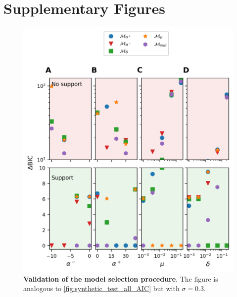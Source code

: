 \newcommand{\M}{\mathcal{M}}
\newcommand{\modnull}{\M_{null}}
\newcommand{\modalphap}{\M_{\alpha^+}}
\newcommand{\modalphan}{\M_{\alpha^-}}
\newcommand{\modmu}{\M_\mu}
\newcommand{\moddelta}{\M_\delta}
\newcommand{\hc}{^{(c)}}
\newcommand{\LL}{\mathcal{L}}
\newcommand{\BIC}{\text{BIC}}
\newcommand{\by}{\textbf{y}}

\graphicspath{{./content/chap4_econobiology/}}

\setcounter{equation}{0}
\setcounter{figure}{0}
\setcounter{table}{0}
\makeatletter %
\renewcommand{\thetable}{S\arabic{table}}
\renewcommand{\theequation}{S\arabic{equation}}
\renewcommand{\thefigure}{S\arabic{figure}}
\makeatother %

\section{Supplementary Figures}
\FloatBarrier


\begin{figure}
  \center
  \includegraphics{figures/SI/synthetic_test_all_AIC_r=0.3.png}
  \caption{\small \textbf{Validation of the model selection procedure}. The figure is analogous to \cref{fig:synthetic_test_all_AIC} but with $\sigma = 0.3$. 
   }\label{figSI:synthetic_test_all_AIC}
\end{figure}

